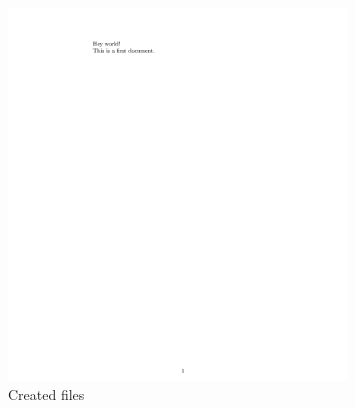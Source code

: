 \documentclass{article}
\begin{document}
\begin{figure}[!h]
\centering
\includegraphics[width=0.8\textwidth]{im2_2.png}
\caption{Created files}
\label{fig:im4}
\end{figure}
\end{document}
